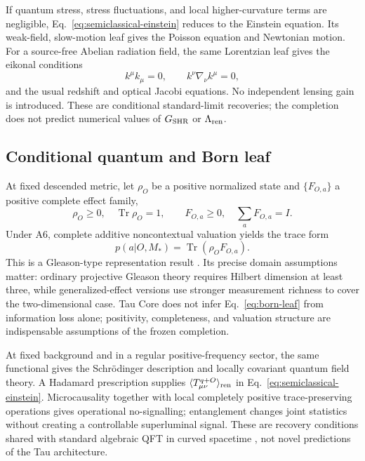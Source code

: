 \documentclass[11pt]{article}
\begin{document}
If quantum stress, stress fluctuations, and local higher-curvature terms are
negligible, Eq.~\eqref{eq:semiclassical-einstein} reduces to the Einstein
equation.  Its weak-field, slow-motion leaf gives the Poisson equation and
Newtonian motion.  For a source-free Abelian radiation field, the same
Lorentzian leaf gives the eikonal conditions
\begin{equation}
  k^\mu k_\mu=0,
  \qquad k^\nu\nabla_\nu k^\mu=0,
  \label{eq:geometric-optics}
\end{equation}
and the usual redshift and optical Jacobi equations.  No independent lensing
gain is introduced.  These are conditional standard-limit recoveries; the
completion does not predict numerical values of \(G_{\rm SHR}\) or
\(\Lambda_{\rm ren}\).

\subsection{Conditional quantum and Born leaf}
\label{sec:mvp-quantum}

At fixed descended metric, let \(\rho_O\) be a positive normalized state and
\(\{F_{O,a}\}\) a positive complete effect family,
\begin{equation}
  \rho_O\geq0,\quad \operatorname{Tr}\rho_O=1,
  \qquad F_{O,a}\geq0,\quad \sum_aF_{O,a}=I.
  \label{eq:state-effects}
\end{equation}
Under A6, complete additive noncontextual valuation yields the trace form
\begin{equation}
  \boxed{p(a|O,M_*)=\operatorname{Tr}(\rho_OF_{O,a}).}
  \label{eq:born-leaf}
\end{equation}
This is a Gleason-type representation result
\cite{Gleason1957,Busch2003}.  Its precise domain assumptions matter:
ordinary projective Gleason theory requires Hilbert dimension at least three,
while generalized-effect versions use stronger measurement richness to cover
the two-dimensional case.  Tau Core does not infer Eq.~\eqref{eq:born-leaf}
from information loss alone; positivity, completeness, and valuation
structure are indispensable assumptions of the frozen completion.

At fixed background and in a regular positive-frequency sector, the same
functional gives the Schr\"odinger description and locally covariant quantum
field theory.  A Hadamard prescription supplies
  \(\langle T_{\mu\nu}^{q+O}\rangle_{\rm ren}\) in
Eq.~\eqref{eq:semiclassical-einstein}.  Microcausality together with local
completely positive trace-preserving operations gives operational
no-signalling; entanglement changes joint statistics without creating a
controllable superluminal signal.  These are recovery conditions shared with
standard algebraic QFT in curved spacetime
\cite{BrunettiFredenhagenVerch2003,HollandsWald2001,HollandsWald2002}, not
novel predictions of the Tau architecture.
\end{document}
